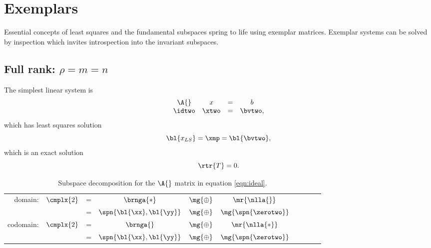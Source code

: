 \section{Exemplars}  %
Essential concepts of least squares and the fundamental subspaces spring to life using exemplar matrices. Exemplar systems can be solved by inspection which invites introspection into the invariant subspaces. 

\clearpage  %

\subsection{Full rank: $\rho = m = n$}  %
The simplest linear system is
  \begin{equation}
    \begin{array}{cccc}
      \A{} & x & = & b \\
      \idtwo & \xtwo & = & \bvtwo,
    \label{eqn:ideal}
    \end{array}
  \end{equation}
which has least squares solution
  \begin{equation*}   %
      \bl{x_{LS}} = \xmp = \bl{\bvtwo},
  \end{equation*}
which is an exact solution
  \begin{equation*}   %
      \rtr{T} = 0.
  \end{equation*}
  
    \begin{table}[h!]
    	\caption[Subspace decomposition for \eqref{eqn:ideal}]{Subspace decomposition for the $\A{}$ matrix in equation \eqref{eqn:ideal}.}
    	\begin{center}
    		\begin{tabular}{rccccccccc}
    		  domain:   & $\cmplx{2}$ & = & $\brnga{*}$ & $\mg{\oplus}$ & $\mr{\nlla{}}$ \\
		               && = & $\spn{\bl{\xx},\bl{\yy}}$ & $\mg{\oplus}$ & $\mg{\spn{\zerotwo}}$ \\[18pt]
    		  codomain: & $\cmplx{2}$ & = & $\brnga{}$ & $\mg{\oplus}$ & $\mr{\nlla{*}}$ \\
		               && = & $\spn{\bl{\xx},\bl{\yy}}$ & $\mg{\oplus}$ & $\mg{\spn{\zerotwo}}$ \\[10pt] 
    		\end{tabular}
    	\end{center}
    \end{table}

